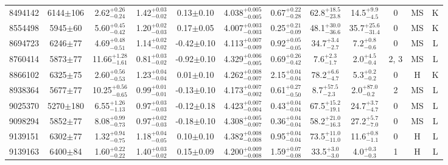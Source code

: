 \begin{landscape}
\begin{longtable}{c|ccccc|ccc|ccc}
	8494142 & 6144$\pm$106   & 2.62$_{-0.24}^{+0.26}$    & 1.42$_{-0.02}^{+0.03}$ & 0.13$\pm$0.10     & 4.038$_{-0.005}^{+0.005}$ & 0.67$_{-0.28}^{+0.22}$ & 62.8$_{-23.8}^{+18.5}$    & 14.5$_{-4.5}^{+9.9}$     & 0 &        MS & K \\
	8554498 & 5945$\pm$60    & 5.60$_{-0.42}^{+0.45}$    & 1.20$_{-0.03}^{+0.02}$ & 0.17$\pm$0.05     & 4.007$_{-0.003}^{+0.003}$ & 0.25$_{-0.09}^{+0.21}$ & 48.1$_{-36.6}^{+30.0}$    & 35.7$_{-31.4}^{+25.6}$   & 0 &        MS & K \\
	8694723 & 6246$\pm$77    & 4.69$_{-0.51}^{+0.48}$    & 1.14$_{-0.02}^{+0.02}$ & -0.42$\pm$0.10    & 4.113$_{-0.009}^{+0.007}$ & 0.92$_{-0.05}^{+0.05}$ & 34.7$_{-2.7}^{+3.4}$      & 7.2$_{-0.6}^{+0.8}$      & 0 &        MS & L \\
	8760414 & 5873$\pm$77    & 11.66$_{-1.61}^{+1.28}$   & 0.81$_{-0.02}^{+0.03}$ & -0.92$\pm$0.10    & 4.329$_{-0.005}^{+0.006}$ & 0.69$_{-0.42}^{+0.26}$ & 7.6$_{-1.7}^{+2.3}$       & 2.0$_{-0.4}^{+4.5}$      & 2, 3 &        MS & L \\
	8866102 & 6325$\pm$75    & 2.60$_{-0.53}^{+0.56}$    & 1.23$_{-0.04}^{+0.04}$ & 0.01$\pm$0.10     & 4.262$_{-0.007}^{+0.008}$ & 2.15$_{-0.04}^{+0.04}$ & 78.2$_{-4.7}^{+6.6}$      & 5.3$_{-0.2}^{+0.2}$      & 0 &        H & K \\
	8938364 & 5677$\pm$77    & 10.25$_{-0.65}^{+0.56}$   & 0.99$_{-0.01}^{+0.01}$ & -0.13$\pm$0.10    & 4.173$_{-0.002}^{+0.007}$ & 0.61$_{-0.50}^{+0.27}$ & 8.7$_{-2.3}^{+57.5}$      & 2.0$_{-0.2}^{+87.0}$     & 2 &        MS & L \\
	9025370 & 5270$\pm$180   & 6.55$_{-1.13}^{+1.26}$    & 0.97$_{-0.03}^{+0.03}$ & -0.12$\pm$0.18    & 4.423$_{-0.004}^{+0.007}$ & 0.43$_{-0.04}^{+0.04}$ & 67.5$_{-19.1}^{+15.2}$    & 24.7$_{-4.7}^{+3.7}$     & 0 &        MS & L \\
	9098294 & 5852$\pm$77    & 8.08$_{-0.73}^{+0.99}$    & 0.97$_{-0.03}^{+0.02}$ & -0.18$\pm$0.10    & 4.308$_{-0.007}^{+0.005}$ & 0.36$_{-0.04}^{+0.04}$ & 58.2$_{-16.3}^{+21.0}$    & 27.2$_{-7.0}^{+5.7}$     & 0 &        MS & L \\
	9139151 & 6302$\pm$77    & 1.32$_{-0.75}^{+0.94}$    & 1.18$_{-0.05}^{+0.04}$ & 0.10$\pm$0.10     & 4.382$_{-0.008}^{+0.008}$ & 0.95$_{-0.04}^{+0.04}$ & 73.5$_{-11.0}^{+11.0}$    & 11.6$_{-1.1}^{+0.8}$     & 0 &        H & L \\
	9139163 & 6400$\pm$84    & 1.60$_{-0.22}^{+0.22}$    & 1.40$_{-0.02}^{+0.03}$ & 0.15$\pm$0.09     & 4.200$_{-0.008}^{+0.009}$ & 1.59$_{-0.08}^{+0.07}$ & 33.5$_{-3.0}^{+3.0}$      & 4.0$_{-0.3}^{+0.3}$      & 1 &        H & L \\

\end{longtable}
\end{landscape}
